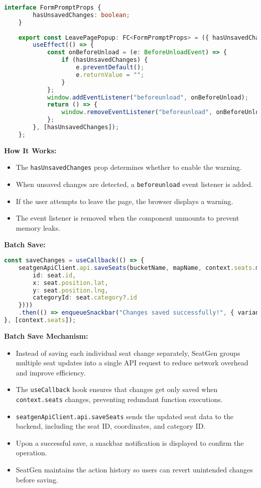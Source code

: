 \begin{lstlisting}[language=TypeScript, caption=Auto-Saving on Unload, label=lst:auto-save-seats]
    interface FormPromptProps {
        hasUnsavedChanges: boolean;
    }
    
    export const LeavePagePopup: FC<FormPromptProps> = ({ hasUnsavedChanges }) => {
        useEffect(() => {
            const onBeforeUnload = (e: BeforeUnloadEvent) => {
                if (hasUnsavedChanges) {
                    e.preventDefault();
                    e.returnValue = "";
                }
            };
            window.addEventListener("beforeunload", onBeforeUnload);
            return () => {
                window.removeEventListener("beforeunload", onBeforeUnload);
            };
        }, [hasUnsavedChanges]);
    };
\end{lstlisting}


\textbf{How It Works:}
\begin{itemize}
    \item The \texttt{hasUnsavedChanges} prop determines whether to enable the warning.
    \item When unsaved changes are detected, a \texttt{beforeunload} event listener is added.
    \item If the user attempts to leave the page, the browser displays a warning.
    \item The event listener is removed when the component unmounts to prevent memory leaks.
\end{itemize}

\textbf{Batch Save:}
\begin{lstlisting}[language=TypeScript, caption=Batch Save Mechanism, label=lst:batch-save-seats]
const saveChanges = useCallback(() => {
    seatgenApiClient.api.saveSeats(bucketName, mapName, context.seats.map(seat => ({
        id: seat.id,
        x: seat.position.lat,
        y: seat.position.lng,
        categoryId: seat.category?.id
    })))
    .then(() => enqueueSnackbar("Changes saved successfully!", { variant: "success" }));
}, [context.seats]);
\end{lstlisting}

\textbf{Batch Save Mechanism:}
\begin{itemize}
    \item Instead of saving each individual seat change separately, SeatGen groups multiple seat updates into a single API request to reduce network overhead and improve efficiency.
    \item The \texttt{useCallback} hook ensures that changes get only saved when \texttt{context.seats} changes, preventing redundant function executions.
    \item \texttt{seatgenApiClient.api.saveSeats} sends the updated seat data to the backend, including the seat ID, coordinates, and category ID.
    \item Upon a successful save, a snackbar notification is displayed to confirm the operation.
    \item SeatGen maintains the action history so users can revert unintended changes before saving.
\end{itemize}

